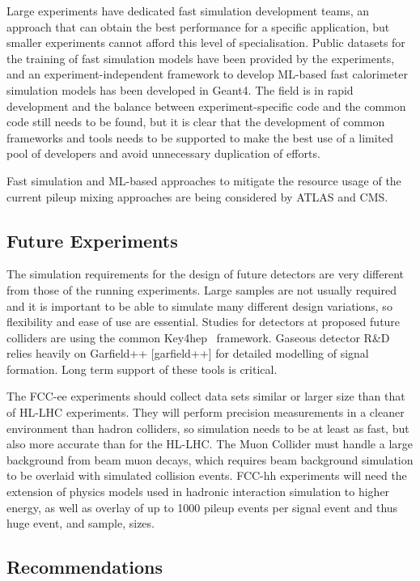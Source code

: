 \documentclass[10pt,a4paper]{article}
\begin{document}
Large experiments have dedicated fast simulation development teams, an approach
that can obtain the best performance for a specific application, but smaller
experiments cannot afford this level of specialisation. Public datasets for the
training of fast simulation models have been provided by the experiments, and an
experiment-independent framework to develop ML-based fast calorimeter simulation
models has been developed in Geant4. The field is in rapid development and the
balance between experiment-specific code and the common code still needs to be
found, but it is clear that the development of common frameworks and tools needs
to be supported to make the best use of a limited pool of developers and avoid
unnecessary duplication of efforts.

Fast simulation and ML-based approaches to mitigate the resource usage
of the current pileup mixing approaches are being considered by ATLAS
and CMS.

\subsection{Future Experiments}\label{future-experiments}

The simulation requirements for the design of future detectors are very
different from those of the running experiments. Large samples are not
usually required and it is important to be able to simulate many
different design variations, so flexibility and ease of use are
essential. Studies for detectors at proposed future colliders are using
the common Key4hep~\cite{Ganis2022} framework. Gaseous detector R\&D relies
heavily on Garfield++ {[}garfield++{]} for detailed modelling of signal
formation. Long term support of these tools is critical.

The FCC-ee experiments should collect data sets similar or
larger size than that of HL-LHC experiments. They will perform precision
measurements in a cleaner environment than hadron colliders, so simulation
needs to be at least as fast, but also more accurate than for the HL-LHC. The
Muon Collider must handle a large background from beam muon decays, which
requires beam background simulation to be overlaid with simulated collision
events. FCC-hh experiments will need the extension of physics models used in
hadronic interaction simulation to higher energy, as well as overlay of up to
1000 pileup events per signal event and thus huge event, and sample, sizes.

\subsection{Recommendations}\label{recommendations-1}
\end{document}

